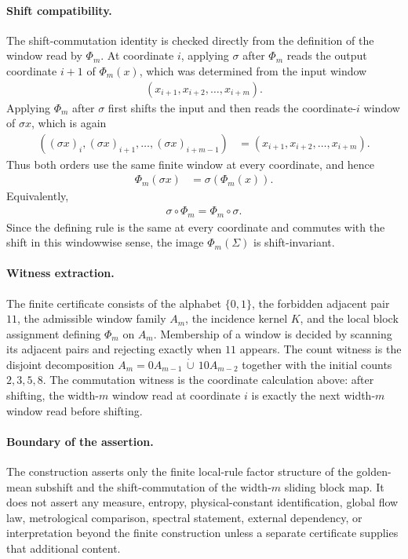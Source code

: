 \paragraph{Shift compatibility.}
The shift-commutation identity is checked directly from the definition of the window read by $\Phi_m$. At coordinate $i$, applying $\sigma$ after $\Phi_m$ reads the output coordinate $i+1$ of $\Phi_m(x)$, which was determined from the input window
$$
\begin{aligned}
(x_{i+1},x_{i+2},\ldots,x_{i+m}).
\end{aligned}
$$
Applying $\Phi_m$ after $\sigma$ first shifts the input and then reads the coordinate-$i$ window of $\sigma x$, which is again
$$
\begin{aligned}
((\sigma x)_i,(\sigma x)_{i+1},\ldots,(\sigma x)_{i+m-1})
  &=(x_{i+1},x_{i+2},\ldots,x_{i+m}).
\end{aligned}
$$
Thus both orders use the same finite window at every coordinate, and hence
$$
\begin{aligned}
\Phi_m(\sigma x)&=\sigma(\Phi_m(x)).
\end{aligned}
$$
Equivalently,
$$
\begin{aligned}
\sigma\circ\Phi_m=\Phi_m\circ\sigma.
\end{aligned}
$$
Since the defining rule is the same at every coordinate and commutes with the shift in this windowwise sense, the image $\Phi_m(\Sigma)$ is shift-invariant.

\paragraph{Witness extraction.}
The finite certificate consists of the alphabet $\{0,1\}$, the forbidden adjacent pair $11$, the admissible window family $A_m$, the incidence kernel $K$, and the local block assignment defining $\Phi_m$ on $A_m$. Membership of a window is decided by scanning its adjacent pairs and rejecting exactly when $11$ appears. The count witness is the disjoint decomposition $A_m=0A_{m-1}\,\dot\cup\,10A_{m-2}$ together with the initial counts $2,3,5,8$. The commutation witness is the coordinate calculation above: after shifting, the width-$m$ window read at coordinate $i$ is exactly the next width-$m$ window read before shifting.

\paragraph{Boundary of the assertion.}
The construction asserts only the finite local-rule factor structure of the golden-mean subshift and the shift-commutation of the width-$m$ sliding block map. It does not assert any measure, entropy, physical-constant identification, global flow law, metrological comparison, spectral statement, external dependency, or interpretation beyond the finite construction unless a separate certificate supplies that additional content.